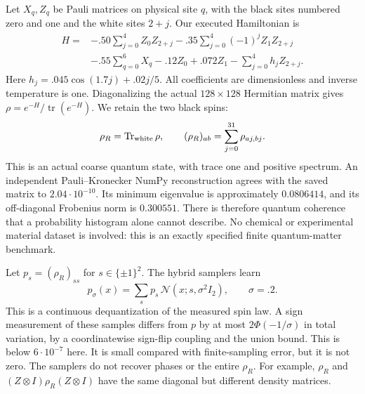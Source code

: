 \documentclass[11pt]{article}
\theoremstyle{definition}\newtheorem{definition}[theorem]{Definition}
\theoremstyle{remark}\newtheorem{remark}[theorem]{Remark}
\begin{document}
Let $X_q,Z_q$ be Pauli matrices on physical site $q$, with the black sites
numbered zero and one and the white sites $2+j$. Our executed Hamiltonian is
\[
\begin{aligned}
 H={}&-.50\sum_{j=0}^4 Z_0Z_{2+j}
   -.35\sum_{j=0}^4(-1)^jZ_1Z_{2+j}\\
 &-.55\sum_{q=0}^6 X_q-.12Z_0+.072Z_1
   -\sum_{j=0}^4 h_jZ_{2+j}.
\end{aligned}
\]
Here $h_j=.045\cos(1.7j)+.02j/5$.
All coefficients are dimensionless and inverse temperature is one.
Diagonalizing the actual $128\times128$ Hermitian matrix gives
$\rho=e^{-H}/\operatorname{tr}(e^{-H})$. We retain the two black spins:
\[
 \rho_R=\operatorname{Tr}_{\rm white}\rho,\qquad
 (\rho_R)_{ab}=\sum_{j=0}^{31}\rho_{aj,bj}.
\]
This is an actual coarse quantum state, with trace one and positive spectrum.
An independent Pauli--Kronecker NumPy reconstruction agrees with the saved
matrix to $2.04\cdot10^{-10}$. Its minimum eigenvalue is approximately
$0.0806414$, and its off-diagonal Frobenius norm is $0.300551$.
There is therefore quantum coherence that a probability histogram alone
cannot describe. No chemical or experimental material dataset is involved:
this is an exactly specified finite quantum-matter benchmark.

Let $p_s=(\rho_R)_{ss}$ for $s\in\{\pm1\}^2$. The hybrid samplers learn
\[
 p_\sigma(x)=\sum_s p_s\,\mathcal N(x;s,\sigma^2I_2),\qquad\sigma=.2.
\]
This is a continuous dequantization of the measured spin law. A sign
measurement of these samples differs from $p$ by at most
$2\Phi(-1/\sigma)$ in total variation, by a coordinatewise sign-flip
coupling and the union bound. This is below $6\cdot10^{-7}$ here.
It is small compared with finite-sampling error, but it is not zero.
The samplers do not recover phases or the entire $\rho_R$. For example,
$\rho_R$ and $(Z\otimes I)\rho_R(Z\otimes I)$ have the same diagonal
but different density matrices.
\end{document}
